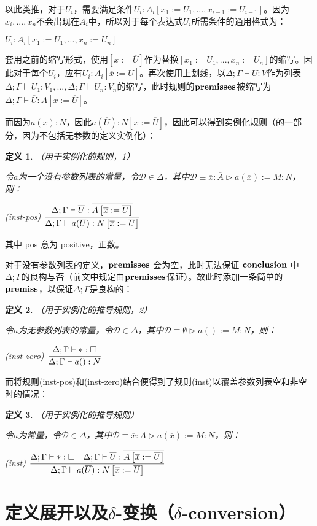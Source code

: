 \documentclass[UTF8]{article}
\newtheorem{thm}{定义}[section]
\begin{document}
		以此类推，对于$U_i$，需要满足条件$U_i:A_i\left[x_1:=U_1,...,x_{i-1}:=U_{i-1}\right]$。因为$x_i,...,x_n$不会出现在$A_i$中，所以对于每个表达式$U_i$所需条件的通用格式为：
		
		$U_i:A_i\left[x_1:=U_1,...,x_n:=U_n\right]$
		
		套用之前的缩写形式，使用$\left[\overline{x}:=\overline{U}\right]$作为替换$\left[x_1:=U_1,...,x_n:=U_n\right]$的缩写。因此对于每个$U_i$，应有$U_i:A_i\left[\overline{x}:=\overline{U}\right]$。再次使用上划线，以$\Delta;\Gamma\vdash\overline{U}:\overline{V}$作为列表$\Delta;\Gamma\vdash U_1:V_1,...,\Delta;\Gamma\vdash U_n:V_n$的缩写，此时规则的$\bf premisses$被缩写为$\Delta;\Gamma\vdash\overline{U}:\overline{A\left[\overline{x}:=\overline{U}\right]}$。
		
		而因为$a(\overline{x}):N$，因此$a(\overline{U}):N\left[\overline{x}:=\overline{U}\right]$，因此可以得到实例化规则（的一部分，因为不包括无参数的定义实例化）：
		
		\begin{thm}（用于实例化的规则，1）
			
			\noindent
			令$a$为一个没有参数列表的常量，令$\mathcal{D}\in\Delta$，其中$\mathcal{D}\equiv\overline{x}:\overline{A}\triangleright a(\overline{x}):=M:N$，则：
			
			(inst-pos) $\cfrac{\Delta;\Gamma\vdash\overline{U}:\overline{A\left[\overline{x}:=\overline{U}\right]}}{\Delta;\Gamma\vdash a(\overline{U}):N\left[\overline{x}:=\overline{U}\right]}$
		\end{thm}
	
		其中 pos 意为 positive，正数。
		
		对于没有参数列表的定义，$\bf premisses$ 会为空，此时无法保证 $\bf conclusion$ 中$\Delta;\Gamma$的良构与否（前文中规定由$\bf premisses$保证）。故此时添加一条简单的$\bf premiss$，以保证$\Delta;\Gamma$是良构的：
		
		\begin{thm}（用于实例化的推导规则，2）
			
			\noindent
			令$a$为无参数列表的常量，令$\mathcal{D}\in\Delta$，其中$\mathcal{D}\equiv\emptyset\triangleright a():=M:N$，则：
			
			(inst-zero) $\cfrac{\Delta;\Gamma\vdash*:\square}{\Delta;\Gamma\vdash a():N}$
		\end{thm}
	
		而将规则(inst-pos)和(inst-zero)结合便得到了规则(inst)以覆盖参数列表空和非空时的情况：
		
		\begin{thm}（用于实例化的推导规则）
			
			\noindent
			令$a$为常量，令$\mathcal{D}\in\Delta$，其中$\mathcal{D}\equiv\overline{x}:\overline{A}\triangleright a(\overline{x}):=M:N$，则：
			
			(inst) $\cfrac{\Delta;\Gamma\vdash*:\square\ \ \ \Delta;\Gamma\vdash\overline{U}:\overline{A\left[\overline{x}:=\overline{U}\right]}}{\Delta;\Gamma\vdash a(\overline{U}):N\left[\overline{x}:=\overline{U}\right]}$
		\end{thm}

	\section{定义展开以及$\delta$-变换（$\delta$-conversion）}
\end{document}
